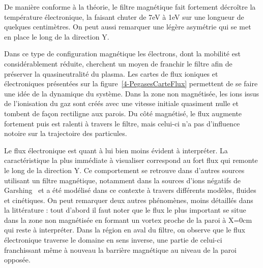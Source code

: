 \begin{refsection}
De manière conforme à la théorie, le filtre magnétique fait fortement décroître
la température électronique, la faisant chuter de 7eV à 1eV sur une
longueur de quelques centimètres. On peut aussi remarquer une légère asymétrie qui se met en
place le long de la direction Y. 

Dans ce type de configuration
magnétique les électrons, dont la mobilité est considérablement réduite,
cherchent un moyen de franchir le filtre afin de préserver la quasineutralité du
plasma. Les cartes de flux ioniques et électroniques présentées sur la figure~\ref{4-PegasesCarteFlux} permettent de se faire une idée de la dynamique
du système. Dans la zone non magnétisée, les ions issus de l'ionisation du gaz
sont créés avec une vitesse initiale quasiment nulle et tombent de façon
rectiligne aux parois. Du côté magnétisé, le flux augmente fortement puis est
ralenti à travers le filtre, mais celui-ci n'a pas d'influence notoire sur la
trajectoire des particules.

Le flux électronique est quant à lui bien moins évident à interpréter. La
caractéristique la plus immédiate à visualiser correspond au fort flux qui
remonte le long de la direction Y. Ce comportement se retrouve dans d'autres
sources utilisant un filtre magnétique, notamment dans la
sources d'ions négatifs de Garshing~\parencite{Fantz} et a été modélisé
dans ce contexte à travers différents
modèles, fluides et cinétiques\parencite{PIC2D,PIC3D,MAGMA}. On peut remarquer
deux autres phénomènes, moins détaillés dans la littérature : tout d'abord il
faut noter que le flux le plus important se situe dans la zone non magnétisée en
formant un vortex proche de la paroi à X=0cm qui reste à interpréter. Dans la
région en aval du filtre, on observe que le flux
électronique traverse le domaine en sens inverse, une partie
de celui-ci franchissant même à nouveau la barrière magnétique au niveau de la
paroi opposée.


\end{refsection}
